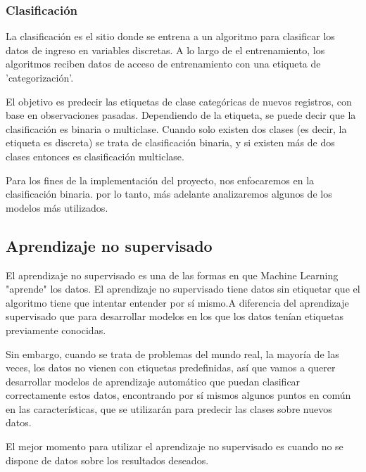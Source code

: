  \subsubsection{Clasificación}\par
 
 La clasificación es el sitio donde se entrena a un algoritmo para clasificar los datos de ingreso en variables discretas. A lo largo de el entrenamiento, los algoritmos reciben datos de acceso de entrenamiento con una etiqueta de 'categorización'.\par
 
 El objetivo es predecir las etiquetas de clase categóricas de nuevos registros, con base en observaciones pasadas. Dependiendo de la etiqueta, se puede decir que la clasificación es binaria o multiclase. Cuando solo existen dos clases (es decir, la etiqueta es discreta) se trata de clasificación binaria, y si existen más de dos clases entonces es clasificación multiclase.\par
 
 Para los fines de la implementación del proyecto, nos enfocaremos en la clasificación binaria. por lo tanto, más adelante analizaremos algunos de los modelos más utilizados.\par
 
 
 
\subsection{Aprendizaje no supervisado}

El aprendizaje no supervisado es una de las formas en que Machine Learning  "aprende" los datos. El aprendizaje no supervisado tiene datos sin etiquetar que el algoritmo tiene que intentar entender por sí mismo.A diferencia del aprendizaje supervisado que para desarrollar modelos en los que los datos tenían etiquetas previamente conocidas. \par

Sin embargo, cuando se trata de problemas del mundo real, la mayoría de las veces, los datos no vienen con etiquetas predefinidas, así que vamos a querer desarrollar modelos de aprendizaje automático que puedan clasificar correctamente estos datos, encontrando por sí mismos algunos puntos en común en las características, que se utilizarán para predecir las clases sobre nuevos datos.\par

El mejor momento para utilizar el aprendizaje no supervisado es cuando no se dispone de datos sobre los resultados deseados.\par

